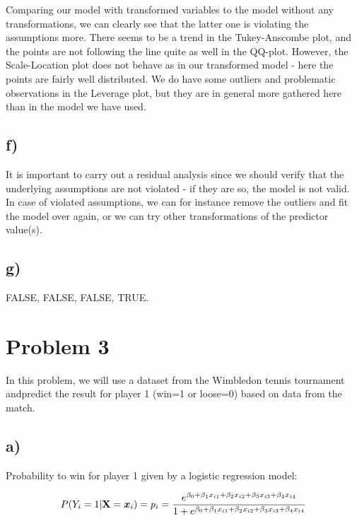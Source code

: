 \documentclass[
]{article}
\begin{document}
Comparing our model with transformed variables to the model without any
transformations, we can clearly see that the latter one is violating the
assumptions more. There seems to be a trend in the Tukey-Anscombe plot,
and the points are not following the line quite as well in the QQ-plot.
However, the Scale-Location plot does not behave as in our transformed
model - here the points are fairly well distributed. We do have some
outliers and problematic observations in the Leverage plot, but they are
in general more gathered here than in the model we have used.

\hypertarget{f-1}{%
\subsection{f)}\label{f-1}}

It is important to carry out a residual analysis since we should verify
that the underlying assumptions are not violated - if they are so, the
model is not valid. In case of violated assumptions, we can for instance
remove the outliers and fit the model over again, or we can try other
transformations of the predictor value(s).

\hypertarget{g-1}{%
\subsection{g)}\label{g-1}}

FALSE, FALSE, FALSE, TRUE.

\hypertarget{problem-3}{%
\section{Problem 3}\label{problem-3}}

In this problem, we will use a dataset from the Wimbledon tennis
tournament andpredict the result for player 1 (win=1 or loose=0) based
on data from the match.

\hypertarget{a-2}{%
\subsection{a)}\label{a-2}}

Probability to win for player 1 given by a logistic regression model:

\[
P(Y_i = 1| {\bf X}={\boldsymbol{x}}_i) = p_i = \frac{e^{\beta_0 + \beta_1x_{i1} + \beta_2 x_{i2} + \beta_3x_{i3} + \beta_4 x_{i4}}}{ 1+ e^{\beta_0 + \beta_1x_{i1} + \beta_2x_{i2}+ \beta_3x_{i3} + \beta_4 x_{i4}}}
\]
\end{document}
